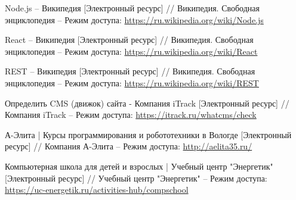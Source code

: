 \begin{thebibliography}{00}
        Node.js -- Википедия 
        [Электронный ресурс] //
        Википедия. Свободная энциклопедия
        --
        Режим доступа:
        \href{https://ru.wikipedia.org/wiki/Node.js}{https://ru.wikipedia.org/wiki/Node.js}

        React -- Википедия 
        [Электронный ресурс] //
        Википедия. Свободная энциклопедия
        --
        Режим доступа:
        \href{https://ru.wikipedia.org/wiki/React}{https://ru.wikipedia.org/wiki/React}


        REST -- Википедия 
        [Электронный ресурс] //
        Википедия. Свободная энциклопедия
        --
        Режим доступа:
        \href{https://ru.wikipedia.org/wiki/REST}{https://ru.wikipedia.org/wiki/REST}
    
        Определить CMS (движок) сайта - Компания iTrack
        [Электронный ресурс] //
        Компания iTrack
        --
        Режим доступа:
        \href{https://itrack.ru/whatcms/check}{https://itrack.ru/whatcms/check}

        А-Элита | Курсы программирования и робототехники в Вологде
        [Электронный ресурс] //
        Компания А-Элита
        --
        Режим доступа:
        \href{http://aelita35.ru/}{http://aelita35.ru/}


        Компьютерная школа для детей и взрослых | Учебный центр "Энергетик"
        [Электронный ресурс] //
        Учебный центр "Энергетик"
        --
        Режим доступа:
        \href{https://uc-energetik.ru/activities-hub/compschool}{https://uc-energetik.ru/activities-hub/compschool}

\end{thebibliography}
\endgroup

\clearpage
